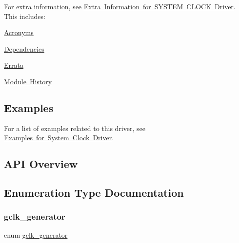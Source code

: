 For extra information, see \mbox{\hyperlink{asfdoc_sam0_system_clock_extra}{Extra Information for S\+Y\+S\+T\+EM C\+L\+O\+CK Driver}}. This includes\+:
\begin{DoxyItemize}
\item \mbox{\hyperlink{asfdoc_sam0_system_clock_extra_asfdoc_sam0_system_clock_extra_acronyms}{Acronyms}}
\item \mbox{\hyperlink{asfdoc_sam0_system_clock_extra_asfdoc_sam0_system_clock_extra_dependencies}{Dependencies}}
\item \mbox{\hyperlink{asfdoc_sam0_system_clock_extra_asfdoc_sam0_system_clock_extra_errata}{Errata}}
\item \mbox{\hyperlink{asfdoc_sam0_system_clock_extra_asfdoc_sam0_system_clock_extra_history}{Module History}}
\end{DoxyItemize}\hypertarget{group__asfdoc__sam0__system__clock__group_asfdoc_sam0_system_clock_examples}{}\subsection{Examples}\label{group__asfdoc__sam0__system__clock__group_asfdoc_sam0_system_clock_examples}
For a list of examples related to this driver, see \mbox{\hyperlink{asfdoc_sam0_system_clock_exqsg}{Examples for System Clock Driver}}.\hypertarget{group__asfdoc__sam0__system__clock__group_asfdoc_sam0_system_clock_api_overview}{}\subsection{A\+P\+I Overview}\label{group__asfdoc__sam0__system__clock__group_asfdoc_sam0_system_clock_api_overview}


\subsection{Enumeration Type Documentation}
\mbox{\label{group__asfdoc__sam0__system__clock__group_ga1ab9bb87560ad127ed982591b7d67311}} 
\subsubsection{\texorpdfstring{gclk\_generator}{gclk\_generator}}
{\footnotesize\ttfamily enum \mbox{\hyperlink{group__asfdoc__sam0__system__clock__group_ga1ab9bb87560ad127ed982591b7d67311}{gclk\+\_\+generator}}}



